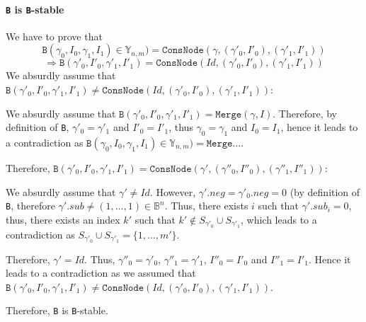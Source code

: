 \documentclass[a4paper,10pt]{article}
\newcommand{\B}{\mathbb{B}}
\newcommand{\Y}{\mathbb{Y}}
\begin{document}
\paragraph{\texttt{B} is \texttt{B}-stable}
We have to prove that
\[\mathtt{B}(\gamma_0, I_0, \gamma_1, I_1) \in \Y_{n, m}) = \mathtt{ConsNode}(\gamma, (\gamma'_0, I'_0), (\gamma'_1, I'_1))\] \[\Rightarrow \mathtt{B}(\gamma'_0, I'_0, \gamma'_1, I'_1) = \mathtt{ConsNode}(Id, (\gamma'_0, I'_0), (\gamma'_1, I'_1))\]
We absurdly assume that $\mathtt{B}(\gamma'_0, I'_0, \gamma'_1, I'_1) \neq \mathtt{ConsNode}(Id, (\gamma'_0, I'_0), (\gamma'_1, I'_1))$: \begin{compactitem}
\item We absurdly assume that $\mathtt{B}(\gamma'_0, I'_0, \gamma'_1, I'_1) = \mathtt{Merge}(\gamma, I)$.
Therefore, by definition of \texttt{B}, $\gamma'_0 = \gamma'_1$ and $I'_0 = I'_1$, thus $\gamma_0 = \gamma_1$ and $I_0 = I_1$, hence it leads to a contradiction as $\mathtt{B}(\gamma_0, I_0, \gamma_1, I_1) \in \Y_{n, m}) = \mathtt{Merge} \dots$.
\item Therefore, $\mathtt{B}(\gamma'_0, I'_0, \gamma'_1, I'_1) = \mathtt{ConsNode}(\gamma', (\gamma''_0, I''_0), (\gamma''_1, I''_1))$: \begin{compactitem}
\item We absurdly assume that $\gamma' \neq Id$.
However, $\gamma'.neg = \gamma'_0.neg = 0$ (by definition of \texttt{B}, therefore $\gamma'.sub \neq (1, \dots, 1) \in\B^n$.
Thus, there exists $i$ such that $\gamma'.sub_i = 0$, thus, there exists an index $k'$ such that $k'\not\in S_{\gamma'_0}\cup S_{\gamma'_1}$, which leads to a contradiction as $S_{\gamma'_0}\cup S_{\gamma'_1} = \{1, \dots, m'\}$.
\item Therefore, $\gamma' = Id$.
Thus, $\gamma''_0 = \gamma'_0$, $\gamma''_1 = \gamma'_1$, $I''_0 = I'_0$ and $I''_1 = I'_1$.
Hence it leads to a contradiction as we assumed that $\mathtt{B}(\gamma'_0, I'_0, \gamma'_1, I'_1) \neq \mathtt{ConsNode}(Id, (\gamma'_0, I'_0), (\gamma'_1, I'_1))$.
\end{compactitem}
\end{compactitem}

Therefore, \texttt{B} is \texttt{B}-stable.
\end{document}
